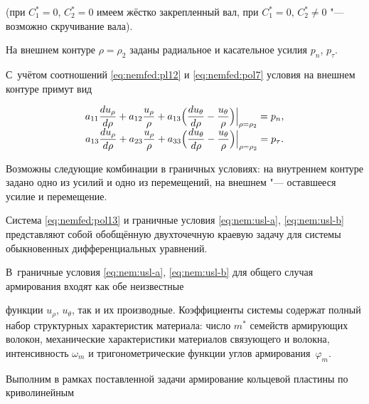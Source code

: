 (при $C_1^*=0$, $C_2^*=0$ имеем жёстко закрепленный вал, при $C_1^*=0$, $C_2^*\neq 0$ "--- возможно скручивание вала).



На внешнем контуре $\rho=\rho_2$  заданы радиальное и касательное усилия $p_n$, $p_\tau$. 

С~учётом соотношений \eqref{eq:nemfed:pl12} и  \eqref{eq:nemfed:pol7} условия на внешнем контуре примут вид

\begin{equation}

\label{eq:nem:usl-b}

\begin{array}{c}

a_{11}\dfrac{d u_\rho}{d \rho}+a_{12}\dfrac{u_\rho}{\rho}+a_{13}\Bigl(\dfrac{d u_\theta}{d \rho}-\dfrac{u_\theta}{\rho} \Bigr) \Big |_{\rho=\rho_2}=p_n,\\

a_{13}\dfrac{d u_\rho}{d

\rho}+a_{23}\dfrac{u_\rho}{\rho}+a_{33}\Bigl(\dfrac{d u_\theta}{d \rho}-\dfrac{u_\theta}{\rho} \Bigr)\Big|_{\rho=\rho_2}=p_\tau.

\end{array}

\end{equation}



Возможны следующие комбинации в граничных условиях: на внутреннем контуре задано одно из усилий и одно из перемещений, на внешнем "--- оставшееся усилие и перемещение. 

Система \eqref{eq:nemfed:pol13} и граничные условия \eqref{eq:nem:usl-a}, \eqref{eq:nem:usl-b} представляют собой обобщённую двухточечную краевую задачу для системы обыкновенных дифференциальных уравнений. 

В~граничные условия \eqref{eq:nem:usl-a}, \eqref{eq:nem:usl-b} для общего случая армирования входят как обе неизвестные

функции $u_\rho$, $u_\theta$, так и их  производные. Коэффициенты системы содержат полный набор структурных характеристик материала: число $m^*$ семейств армирующих волокон,  механические характеристики материалов связующего и волокна, интенсивность $\omega_m$ и тригонометрические функции углов армирования~$\varphi_m$.



\smallskip



 Выполним в рамках поставленной задачи армирование кольцевой пластины по криволинейным

